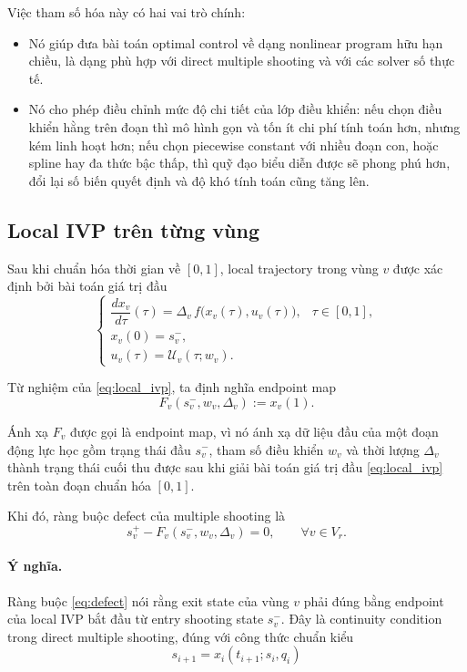 \documentclass[12pt]{article}
\begin{document}
Việc tham số hóa này có hai vai trò chính:
\begin{itemize}
    \item Nó giúp đưa bài toán optimal control về dạng nonlinear program hữu hạn chiều, là dạng phù hợp với direct multiple shooting và với các solver số thực tế.
    \item Nó cho phép điều chỉnh mức độ chi tiết của lớp điều khiển: nếu chọn điều khiển hằng trên đoạn thì mô hình gọn và tốn ít chi phí tính toán hơn, nhưng kém linh hoạt hơn; nếu chọn piecewise constant với nhiều đoạn con, hoặc spline hay đa thức bậc thấp, thì quỹ đạo biểu diễn được sẽ phong phú hơn, đổi lại số biến quyết định và độ khó tính toán cũng tăng lên.
\end{itemize}

\subsection{Local IVP trên từng vùng}

Sau khi chuẩn hóa thời gian về $[0,1]$, local trajectory trong vùng $v$ được xác định bởi bài toán giá trị đầu
\begin{equation}
\begin{cases}
\dfrac{d x_v}{d\tau}(\tau)=\Delta_v\,f\bigl(x_v(\tau),u_v(\tau)\bigr), & \tau\in[0,1],\\[4pt]
x_v(0)=s_v^-,\\
u_v(\tau)=\mathcal U_v(\tau;w_v).
\end{cases}
\label{eq:local_ivp}
\end{equation}

Từ nghiệm của \eqref{eq:local_ivp}, ta định nghĩa endpoint map
\begin{equation}
F_v(s_v^-,w_v,\Delta_v):=x_v(1).
\label{eq:Fv}
\end{equation}

Ánh xạ $F_v$ được gọi là endpoint map, vì nó ánh xạ dữ liệu đầu của một đoạn động lực học gồm trạng thái đầu $s_v^-$, tham số điều khiển $w_v$ và thời lượng $\Delta_v$ thành trạng thái cuối thu được sau khi giải bài toán giá trị đầu \eqref{eq:local_ivp} trên toàn đoạn chuẩn hóa $[0,1]$.

Khi đó, ràng buộc defect của multiple shooting là
\begin{equation}
s_v^+ - F_v(s_v^-,w_v,\Delta_v)=0,
\qquad \forall v\in V_r.
\label{eq:defect}
\end{equation}

\paragraph{Ý nghĩa.}
Ràng buộc \eqref{eq:defect} nói rằng exit state của vùng $v$ phải đúng bằng endpoint của local IVP bắt đầu từ entry shooting state $s_v^-$. Đây là continuity condition trong direct multiple shooting, đúng với công thức chuẩn kiểu
\[
s_{i+1}=x_i(t_{i+1};s_i,q_i)
\]
\end{document}
